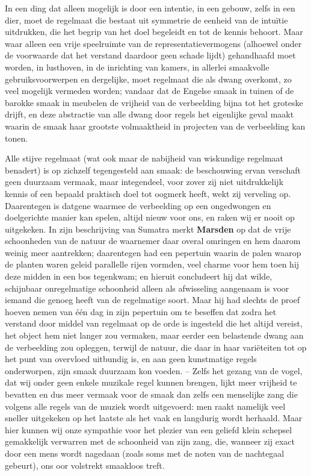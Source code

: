 In een ding dat alleen mogelijk is door een intentie, in een gebouw, zelfs in een dier, moet de regelmaat die bestaat uit symmetrie de eenheid van de intuïtie uitdrukken, die het begrip van het doel begeleidt en tot de kennis behoort. Maar waar alleen een vrije speelruimte van de representatievermogens (alhoewel onder de voorwaarde dat het verstand daardoor geen schade lijdt) gehandhaafd moet worden, in lusthoven, in de inrichting van kamers, in allerlei smaakvolle gebruiksvoorwerpen en dergelijke, moet regelmaat die als dwang overkomt, zo veel mogelijk vermeden worden; vandaar dat de Engelse smaak in tuinen of de barokke smaak in meubelen de vrijheid van de verbeelding bijna tot het groteske drijft, en deze abstractie van alle dwang door regels het eigenlijke geval maakt waarin de smaak haar grootste volmaaktheid in projecten van de verbeelding kan tonen.

Alle stijve regelmaat (wat ook maar de nabijheid van wiskundige regelmaat benadert) is op zichzelf tegengesteld aan smaak: de beschouwing ervan verschaft geen duurzaam vermaak, maar integendeel, voor zover zij niet uitdrukkelijk kennis of een bepaald praktisch doel tot oogmerk heeft, wekt zij verveling op. Daarentegen is datgene waarmee de verbeelding op een ongedwongen en doelgerichte manier kan spelen, altijd nieuw voor ons, en raken wij er nooit op uitgekeken. In zijn beschrijving van Sumatra merkt \textbf{Marsden} op dat de vrije schoonheden van de natuur de waarnemer daar overal omringen en hem daarom weinig meer aantrekken; daarentegen had een pepertuin waarin de palen waarop de planten waren geleid parallelle rijen vormden, veel charme voor hem toen hij deze midden in een bos tegenkwam; en hieruit concludeert hij dat wilde, schijnbaar onregelmatige schoonheid alleen als afwisseling aangenaam is voor iemand die genoeg heeft van de regelmatige soort. Maar hij had slechts de proef hoeven nemen van één dag in zijn pepertuin om te beseffen dat zodra het verstand door middel van regelmaat op de orde is ingesteld die het altijd vereist, het object hem niet langer zou vermaken, maar eerder een belastende dwang aan de verbeelding zou opleggen, terwijl de natuur, die daar in haar variëteiten tot op het punt van overvloed uitbundig is, en aan geen kunstmatige regels onderworpen, zijn smaak duurzaam kon voeden. – Zelfs het gezang van de vogel, dat wij onder geen enkele muzikale regel kunnen brengen, lijkt meer vrijheid te bevatten en dus meer vermaak voor de smaak dan zelfs een menselijke zang die volgens alle regels van de muziek wordt uitgevoerd: men raakt namelijk veel sneller uitgekeken op het laatste als het vaak en langdurig wordt herhaald. Maar hier kunnen wij onze sympathie voor het plezier van een geliefd klein schepsel gemakkelijk verwarren met de schoonheid van zijn zang, die, wanneer zij exact door een mens wordt nagedaan (zoals soms met de noten van de nachtegaal gebeurt), ons oor volstrekt smaakloos treft.

